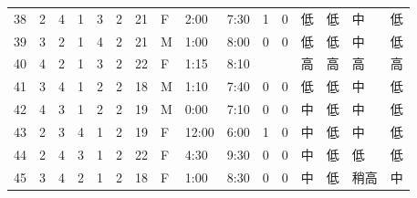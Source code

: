 \begin{table}[htbp]
{\begin{tabular}{llllllllllllllll}
38                  & 2                    & 4                    & 1                    & 3                    & 2                  & 21                     & F                   & 2:00                  & 7:30                  & 1                    & 0                    & 低     & 低     & 中     & 低     \\
39                  & 3                    & 2                    & 1                    & 4                    & 2                  & 21                     & M                   & 1:00                  & 8:00                  & 0                    & 0                    & 低     & 低     & 中     & 低     \\
40                  & 4                    & 2                    & 1                    & 3                    & 2                  & 22                     & F                   & 1:15                  & 8:10                  &                      &                      & 高     & 高     & 高     & 高     \\
41                  & 3                    & 4                    & 1                    & 2                    & 2                  & 18                     & M                   & 1:10                  & 7:40                  & 0                    & 0                    & 低     & 低     & 中     & 低     \\
42                  & 4                    & 3                    & 1                    & 2                    & 2                  & 19                     & M                   & 0:00                  & 7:10                  & 0                    & 0                    & 中     & 低     & 中     & 低     \\
43                  & 2                    & 3                    & 4                    & 1                    & 2                  & 19                     & F                   & 12:00                 & 6:00                  & 1                    & 0                    & 中     & 低     & 中     & 低     \\
44                  & 2                    & 4                    & 3                    & 1                    & 2                  & 22                     & F                   & 4:30                  & 9:30                  & 0                    & 0                    & 中     & 低     & 低     & 低     \\
45                  & 3                    & 4                    & 2                    & 1                    & 2                  & 18                     & F                   & 1:00                  & 8:30                  & 0                    & 0                    & 中     & 低     & 稍高    & 中     \\

\end{tabular}}
\end{table}
